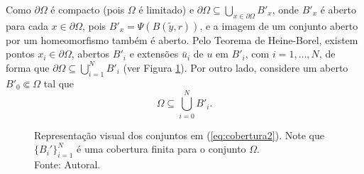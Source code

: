 \begin{prf}
    Como $\partial\Omega$ é compacto (pois $\Omega$ é limitado) e $\partial \Omega \subseteq \bigcup_{x \in \partial\Omega} B'_x$,
    onde $B'_x$ é aberto para cada $x \in \partial\Omega$, pois $B'_x = \Psi(B(\tilde y, r))$, e a imagem de um conjunto aberto por um homeomorfismo também é aberto. Pelo Teorema de Heine-Borel, existem pontos $x_i \in \partial\Omega$, abertos $B'_i$ e extensões $\bar u_i$ de $u$ em $B'_i$, com $i = 1,\dots,N$, de forma que $\partial\Omega \subseteq \bigcup_{i=1}^N B'_i$ (ver Figura \ref{fig:coberturafronteirab0}).
    Por outro lado, considere um aberto $B'_0 \Subset \Omega$ tal que
    \begin{equation} \label{eq:cobertura2}
        \Omega \subseteq \bigcup_{i=0}^N B'_i.
    \end{equation}
    \begin{figure}
        \centering
        
        \caption{Representação visual dos conjuntos em (\ref{eq:cobertura2}). Note que $\{B_i'\}_{i=1}^N$ é uma cobertura finita para o conjunto $\Omega$.\\Fonte: Autoral.}
        \label{fig:coberturafronteirab0}
    \end{figure}



\end{prf}
